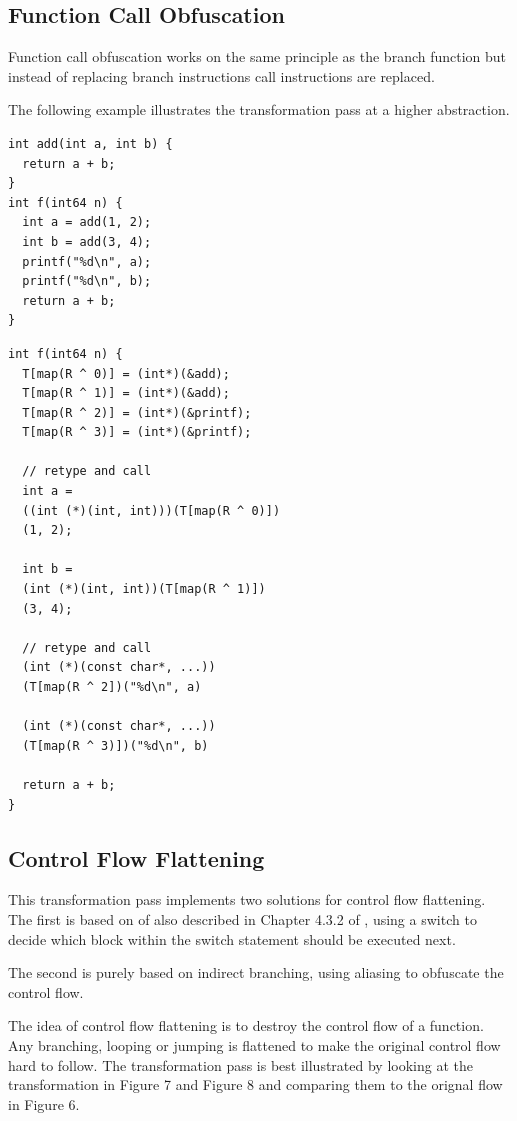 \subsection{Function Call Obfuscation}

Function call obfuscation works on the same principle as the branch function but instead of replacing branch instructions
call instructions are replaced.

The following example illustrates the transformation pass at a higher abstraction.

\lstset{language=C++} %
\lstset{basicstyle=\ttfamily} %
\begin{lstlisting}
int add(int a, int b) {
  return a + b;
}
int f(int64 n) {
  int a = add(1, 2);
  int b = add(3, 4);
  printf("%d\n", a);
  printf("%d\n", b);
  return a + b;
}
\end{lstlisting}

\lstset{language=C++} %
\lstset{basicstyle=\ttfamily} %
\begin{lstlisting}
int f(int64 n) {
  T[map(R ^ 0)] = (int*)(&add);
  T[map(R ^ 1)] = (int*)(&add);
  T[map(R ^ 2)] = (int*)(&printf);
  T[map(R ^ 3)] = (int*)(&printf);

  // retype and call
  int a =
  ((int (*)(int, int)))(T[map(R ^ 0)])
  (1, 2);

  int b =
  (int (*)(int, int))(T[map(R ^ 1)])
  (3, 4);

  // retype and call
  (int (*)(const char*, ...))
  (T[map(R ^ 2])("%d\n", a)

  (int (*)(const char*, ...))
  (T[map(R ^ 3)])("%d\n", b)

  return a + b;
}
\end{lstlisting}

\subsection{Control Flow Flattening}

This transformation pass implements two solutions for control flow flattening. The first is based on of \cite{ollvm} also
described in Chapter 4.3.2 of \cite{ss-chpt4}, using a switch to decide which block within the switch statement should be executed next.

The second is purely based on indirect branching, using aliasing to obfuscate the control flow.

The idea of control flow flattening is to destroy the control flow of a function. Any branching, looping or jumping is
flattened to make the original control flow hard to follow. The transformation pass is best illustrated by looking at the
transformation in Figure 7 and Figure 8 and comparing them to the orignal flow in Figure 6.


